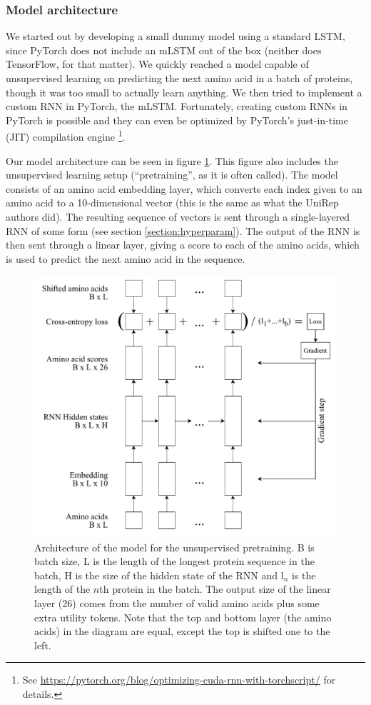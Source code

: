 \documentclass[a4paper,12pt]{article}
\begin{document}
\subsubsection{Model architecture}
We started out by developing a small dummy model using a standard LSTM, since PyTorch does not include an mLSTM out of the box (neither does TensorFlow, for that matter). We quickly reached a model capable of unsupervised learning on predicting the next amino acid in a batch of proteins, though it was too small to actually learn anything. We then tried to implement a custom RNN in PyTorch, the mLSTM. Fortunately, creating custom RNNs in PyTorch is possible and they can even be optimized by PyTorch's just-in-time (JIT) compilation engine \footnote{See \url{https://pytorch.org/blog/optimizing-cuda-rnn-with-torchscript/} for details.}.

Our model architecture can be seen in figure \ref{fig:pretrain_arch}. This figure also includes the unsupervised learning setup (``pretraining'', as it is often called). The model consists of an amino acid embedding layer, which converts each index given to an amino acid to a 10-dimensional vector (this is the same as what the UniRep authors did). The resulting sequence of vectors is sent through a single-layered RNN of some form (see section \ref{section:hyperparam}). The output of the RNN is then sent through a linear layer, giving a score to each of the amino acids, which is used to predict the next amino acid in the sequence.

\begin{figure}
    \centering
    \includegraphics[width = \linewidth]{figures/pretraining_diagram.pdf}
    \caption{Architecture of the model for the unsupervised pretraining. B is batch size, L is the length of the longest protein sequence in the batch, H is the size of the hidden state of the RNN and $\text{l}_n$ is the length of the $n$th protein in the batch. The output size of the linear layer (26) comes from the number of valid amino acids plus some extra utility tokens. Note that the top and bottom layer (the amino acids) in the diagram are equal, except the top is shifted one to the left.}
    \label{fig:pretrain_arch}
\end{figure}
\end{document}
